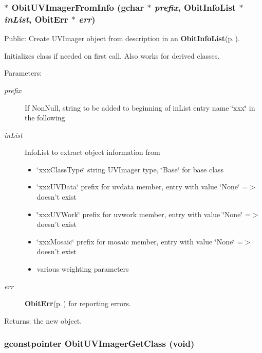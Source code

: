 \subsubsection{$\ast$ Obit\-UVImager\-From\-Info (gchar $\ast$ {\em prefix}, {\bf Obit\-Info\-List} $\ast$ {\em in\-List}, {\bf Obit\-Err} $\ast$ {\em err})}\label{ObitUVImager_8h_a13}


Public: Create UVImager object from description in an {\bf Obit\-Info\-List}{\rm (p.\,\pageref{structObitInfoList})}. 

Initializes class if needed on first call. Also works for derived classes. \begin{Desc}
\item[Parameters:]
\begin{description}
\item[{\em prefix}]If Non\-Null, string to be added to beginning of in\-List entry name \char`\"{}xxx\char`\"{} in the following \item[{\em in\-List}]Info\-List to extract object information from \begin{itemize}
\item \char`\"{}xxx\-Class\-Type\char`\"{} string UVImager type, \char`\"{}Base\char`\"{} for base class \item \char`\"{}xxx\-UVData\char`\"{} prefix for uvdata member, entry with value \char`\"{}None\char`\"{} =$>$ doesn't exist \item \char`\"{}xxx\-UVWork\char`\"{} prefix for uvwork member, entry with value \char`\"{}None\char`\"{} =$>$ doesn't exist \item \char`\"{}xxx\-Mosaic\char`\"{} prefix for mosaic member, entry with value \char`\"{}None\char`\"{} =$>$ doesn't exist \item various weighting parameters \end{itemize}
\item[{\em err}]{\bf Obit\-Err}{\rm (p.\,\pageref{structObitErr})} for reporting errors. \end{description}
\end{Desc}
\begin{Desc}
\item[Returns:]the new object. \end{Desc}
\subsubsection{\setlength{\rightskip}{0pt plus 5cm}gconstpointer Obit\-UVImager\-Get\-Class (void)}\label{ObitUVImager_8h_a14}


